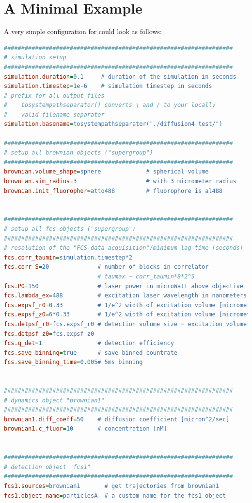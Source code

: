 \section{A Minimal Example}
\label{sec:AMinimalExample}
A very simple configuration for \df could look as follows:
\begin{lstlisting}[language=INI] 
##################################################################
# simulation setup
##################################################################
simulation.duration=0.1     # duration of the simulation in seconds
simulation.timestep=1e-6    # simulation timestep in seconds
# prefix for all output files 
#    tosystempathseparator() converts \ and / to your locally
#    valid filename separator
simulation.basename=tosystempathseparator("./diffusion4_test/")

##################################################################
# setup all brownian objects ("supergroup")
##################################################################
brownian.volume_shape=sphere             # spherical volume 
brownian.sim_radius=3                    # with 3 micrometer radius
brownian.init_fluorophor=atto488         # fluorophore is al488


##################################################################
# setup all fcs objects ("supergroup")
##################################################################
# resolution of the "FCS-data acquisition"/minimum lag-time [seconds]
fcs.corr_taumin=simulation.timestep*2
fcs.corr_S=20              # number of blocks in correlator
                           # taumax ~ corr_taumin*8*2^S
fcs.P0=150                 # laser power in microWatt above objective
fcs.lambda_ex=488          # excitation laser wavelength in nanometers
fcs.expsf_r0=0.33          # 1/e^2 width of excitation volume [micrometers]
fcs.expsf_z0=6*0.33        # 1/e^2 width of excitation volume [micrometers]
fcs.detpsf_r0=fcs.expsf_r0 # detection volume size = excitation volume size
fcs.detpsf_z0=fcs.expsf_z0
fcs.q_det=1                # detection efficiency
fcs.save_binning=true      # save binned countrate
fcs.save_binning_time=0.005# 5ms binning


##################################################################
# dynamics object "brownian1"
##################################################################
brownian1.diff_coeff=50    # diffusion coefficient [micron^2/sec]
brownian1.c_fluor=10       # concentration [nM]


##################################################################
# detection object "fcs1"
##################################################################
fcs1.sources=brownian1       # get trajectories from brownian1
fcs1.object_name=particlesA  # a custom name for the fcs1-object
\end{lstlisting}

